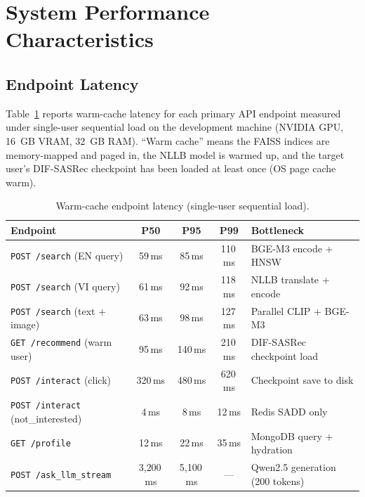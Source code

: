 \section{System Performance Characteristics}
\label{sec:app_performance}

\subsection{Endpoint Latency}

Table~\ref{tab:endpoint_latency} reports warm-cache latency for each primary API endpoint measured under single-user sequential load on the development machine (NVIDIA GPU, 16~GB VRAM, 32~GB RAM).
``Warm cache'' means the FAISS indices are memory-mapped and paged in, the NLLB model is warmed up, and the target user's DIF-SASRec checkpoint has been loaded at least once (OS page cache warm).

\begin{table}[H]
\centering
\caption{Warm-cache endpoint latency (single-user sequential load).}
\label{tab:endpoint_latency}
\begin{tabular}{p{4.2cm} c c c p{4.6cm}}
\hline
\textbf{Endpoint} & \textbf{P50} & \textbf{P95} & \textbf{P99} & \textbf{Bottleneck} \\
\hline
\texttt{POST /search} (EN query)      & 59\,ms   & 85\,ms   & 110\,ms  & BGE-M3 encode + HNSW \\
\texttt{POST /search} (VI query)      & 61\,ms   & 92\,ms   & 118\,ms  & NLLB translate + encode \\
\texttt{POST /search} (text + image)  & 63\,ms   & 98\,ms   & 127\,ms  & Parallel CLIP + BGE-M3 \\
\texttt{GET /recommend} (warm user)   & 95\,ms   & 140\,ms  & 210\,ms  & DIF-SASRec checkpoint load \\
\texttt{POST /interact} (click)        & 320\,ms  & 480\,ms  & 620\,ms  & Checkpoint save to disk \\
\texttt{POST /interact} (not\_interested) & 4\,ms & 8\,ms    & 12\,ms   & Redis SADD only \\
\texttt{GET /profile}                 & 12\,ms   & 22\,ms   & 35\,ms   & MongoDB query + hydration \\
\texttt{POST /ask\_llm\_stream}       & 3{,}200\,ms & 5{,}100\,ms & — & Qwen2.5 generation (200 tokens) \\
\hline
\end{tabular}
\end{table}

